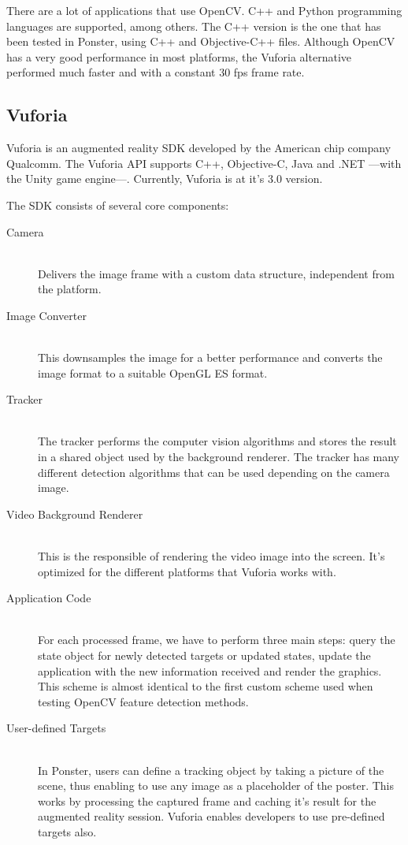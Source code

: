There are a lot of applications that use OpenCV. C++ and Python programming
languages are supported, among others. The C++ version is the one that has been
tested in Ponster, using C++ and Objective-C++ files. Although OpenCV has a
very good performance in most platforms, the Vuforia alternative performed much
faster and with a constant 30 fps frame rate.

\subsection{Vuforia}
Vuforia is an augmented reality SDK developed by the American chip company
Qualcomm\textregistered. The Vuforia API supports C++, Objective-C, Java and .NET
---with the Unity game engine---. Currently, Vuforia is at it's 3.0 version. 

The SDK consists of several core components\cite{vuforiasdk01}: 
\begin{description}
\item [Camera] \hfill \\
Delivers the image frame with a custom data structure, independent from the
platform.
\item [Image Converter] \hfill \\
This downsamples the image for a better performance and converts the image format to
a suitable OpenGL ES format.
\item [Tracker] \hfill \\
The tracker performs the computer vision algorithms and stores the result in a
shared object used by the background renderer. The tracker has many different
detection algorithms that can be used depending on the camera image.
\item [Video Background Renderer] \hfill \\
This is the responsible of rendering the video image into the screen. It's optimized
for the different platforms that Vuforia works with.
\item [Application Code] \hfill \\
For each processed frame, we have to perform three main steps: query the state
object for newly detected targets or updated states, update the application with the
new information received and render the graphics. This scheme is almost identical to
the first custom scheme used when testing OpenCV feature detection methods.
\item [User-defined Targets] \hfill \\
In Ponster, users can define a tracking object by taking a picture of the scene,
thus enabling to use any image as a placeholder of the poster. This works by
processing the captured frame and caching it's result for the augmented reality
session. Vuforia enables developers to use pre-defined targets also.
\end{description}

